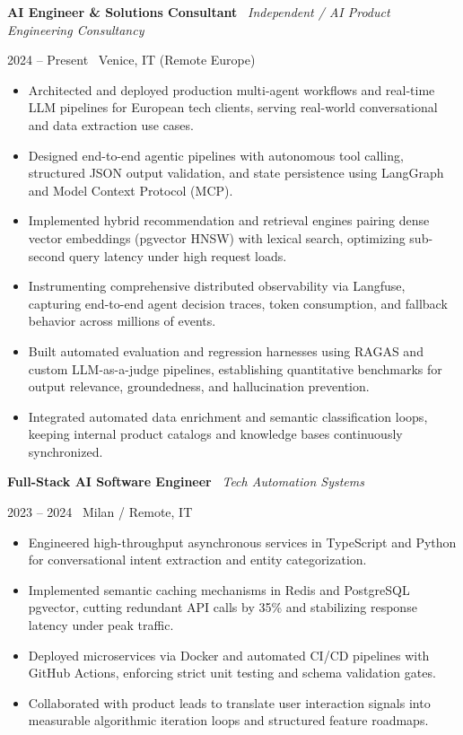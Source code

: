 \documentclass[a4paper,10pt]{article}
\newcommand{\role}[4]{%
  \vspace{2pt}\noindent
  \begin{minipage}[t]{0.70\textwidth}\raggedright\textbf{#1} \textbullet\ \textit{#3}\end{minipage}%
  \hfill
  \begin{minipage}[t]{0.28\textwidth}\raggedleft\footnotesize\color{gray}#2 \textbullet\ #4\end{minipage}%
  \vspace{1pt}%
}
\begin{document}
\role{AI Engineer \& Solutions Consultant}{2024 -- Present}{Independent / AI Product Engineering Consultancy}{Venice, IT (Remote Europe)}
\begin{itemize}
  \item Architected and deployed production multi-agent workflows and real-time LLM pipelines for European tech clients, serving real-world conversational and data extraction use cases.
  \item Designed end-to-end agentic pipelines with autonomous tool calling, structured JSON output validation, and state persistence using LangGraph and Model Context Protocol (MCP).
  \item Implemented hybrid recommendation and retrieval engines pairing dense vector embeddings (pgvector HNSW) with lexical search, optimizing sub-second query latency under high request loads.
  \item Instrumenting comprehensive distributed observability via Langfuse, capturing end-to-end agent decision traces, token consumption, and fallback behavior across millions of events.
  \item Built automated evaluation and regression harnesses using RAGAS and custom LLM-as-a-judge pipelines, establishing quantitative benchmarks for output relevance, groundedness, and hallucination prevention.
  \item Integrated automated data enrichment and semantic classification loops, keeping internal product catalogs and knowledge bases continuously synchronized.
\end{itemize}

\vspace{3pt}
\role{Full-Stack AI Software Engineer}{2023 -- 2024}{Tech Automation Systems}{Milan / Remote, IT}
\begin{itemize}
  \item Engineered high-throughput asynchronous services in TypeScript and Python for conversational intent extraction and entity categorization.
  \item Implemented semantic caching mechanisms in Redis and PostgreSQL pgvector, cutting redundant API calls by 35\% and stabilizing response latency under peak traffic.
  \item Deployed microservices via Docker and automated CI/CD pipelines with GitHub Actions, enforcing strict unit testing and schema validation gates.
  \item Collaborated with product leads to translate user interaction signals into measurable algorithmic iteration loops and structured feature roadmaps.
\end{itemize}
\end{document}
